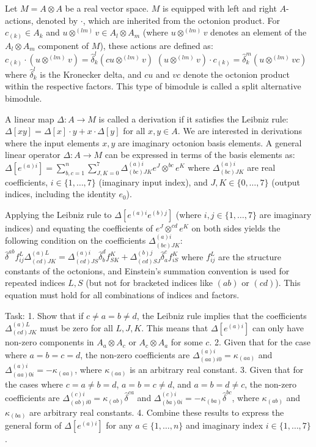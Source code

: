 \documentclass[10pt]{article}
\begin{document}
Let $M = A \otimes A$ be a real vector space. $M$ is equipped with left and right $A$-actions, denoted by $\cdot$, which are inherited from the octonion product. For $c_{(k)} \in A_k$ and $u \otimes^{(lm)} v \in A_l \otimes A_m$ (where $u \otimes^{(lm)} v$ denotes an element of the $A_l \otimes A_m$ component of $M$), these actions are defined as:
$c_{(k)}\cdot (u\otimes^{(lm)} v)=\hat{\delta}^l_k(cu\otimes^{(lm)} v)$
$(u\otimes^{(lm)} v)\cdot c_{(k)}=\hat{\delta}^m_k(u\otimes^{(lm)} vc)$
where $\hat{\delta}^l_k$ is the Kronecker delta, and $cu$ and $vc$ denote the octonion product within the respective factors. This type of bimodule is called a split alternative bimodule.

A linear map $\Delta: A \rightarrow M$ is called a derivation if it satisfies the Leibniz rule:
$\Delta[xy] = \Delta[x]\cdot y + x\cdot \Delta[y]$
for all $x,y \in A$. We are interested in derivations where the input elements $x,y$ are imaginary octonion basis elements. A general linear operator $\Delta: A \rightarrow M$ can be expressed in terms of the basis elements as:
$\Delta[e^{(a)i}] = \sum_{b,c=1}^n \sum_{J,K=0}^7 \Delta^{(a)i}_{(bc)JK} e^J\otimes^{bc}e^K$
where $\Delta^{(a)i}_{(bc)JK}$ are real coefficients, $i \in \{1, \dots, 7\}$ (imaginary input index), and $J,K \in \{0, \dots, 7\}$ (output indices, including the identity $e_0$).

Applying the Leibniz rule to $\Delta[e^{(a)i}e^{(b)j}]$ (where $i,j \in \{1, \dots, 7\}$ are imaginary indices) and equating the coefficients of $e^J \otimes^{cd} e^K$ on both sides yields the following condition on the coefficients $\Delta^{(a)i}_{(bc)JK}$:
$\hat{\delta}^{ab} f^L_{ij} \Delta^{(a)L}_{(cd)JK} = \Delta^{(a)i}_{(cd)JS} \hat{\delta}^d_b f^K_{SK} + \Delta^{(b)j}_{(cd)SJ} \hat{\delta}^c_a f^K_{iS}$
where $f^L_{ij}$ are the structure constants of the octonions, and Einstein's summation convention is used for repeated indices $L,S$ (but not for bracketed indices like $(ab)$ or $(cd)$). This equation must hold for all combinations of indices and factors.

Task:
1.  Show that if $c \neq a=b \neq d$, the Leibniz rule implies that the coefficients $\Delta^{(a)L}_{(cd)JK}$ must be zero for all $L,J,K$. This means that $\Delta[e^{(a)i}]$ can only have non-zero components in $A_a \otimes A_c$ or $A_c \otimes A_a$ for some $c$.
2.  Given that for the case where $a=b=c=d$, the non-zero coefficients are $\Delta^{(a)i}_{(aa)i0} = \kappa_{(aa)}$ and $\Delta^{(a)i}_{(aa)0i} = -\kappa_{(aa)}$, where $\kappa_{(aa)}$ is an arbitrary real constant.
3.  Given that for the cases where $c=a \neq b=d$, $a=b=c \neq d$, and $a=b=d \neq c$, the non-zero coefficients are $\Delta^{(c)i}_{(ab)i0} = \kappa_{(ab)}\hat{\delta}^{ca}$ and $\Delta^{(c)i}_{(ba)0i} = -\kappa_{(ba)}\hat{\delta}^{bc}$, where $\kappa_{(ab)}$ and $\kappa_{(ba)}$ are arbitrary real constants.
4.  Combine these results to express the general form of $\Delta[e^{(a)i}]$ for any $a \in \{1, \dots, n\}$ and imaginary index $i \in \{1, \dots, 7\}$.
\end{document}
